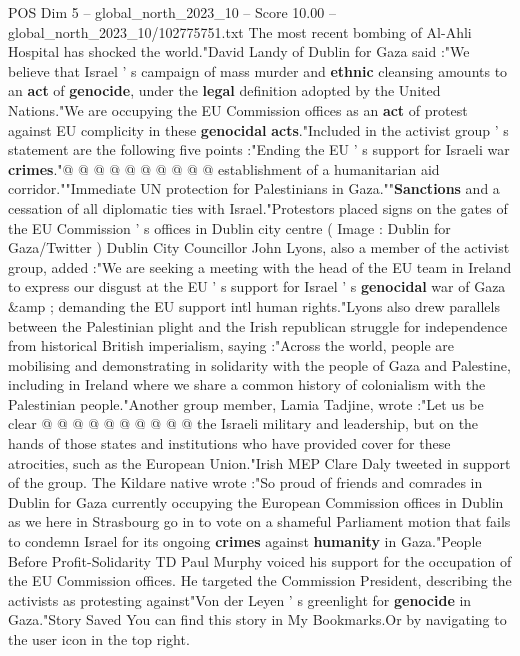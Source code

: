 \begin{textsample}{POS Dim 5 – global\_north\_2023\_10 – Score 10.00 – global\_north\_2023\_10/102775751.txt}
The most recent bombing of Al-Ahli Hospital has shocked the world."David Landy of Dublin for Gaza said :"We believe that Israel ' s campaign of mass murder and \textbf{ethnic} cleansing amounts to an \textbf{act} of \textbf{genocide}, under the \textbf{legal} definition adopted by the United Nations."We are occupying the EU Commission offices as an \textbf{act} of protest against EU complicity in these \textbf{genocidal} \textbf{acts}."Included in the activist group ' s statement are the following five points :"Ending the EU ' s support for Israeli war \textbf{crimes}."@ @ @ @ @ @ @ @ @ @ establishment of a humanitarian aid corridor.""Immediate UN protection for Palestinians in Gaza.""\textbf{Sanctions} and a cessation of all diplomatic ties with Israel."Protestors placed signs on the gates of the EU Commission ' s offices in Dublin city centre ( Image : Dublin for Gaza/Twitter ) Dublin City Councillor John Lyons, also a member of the activist group, added :"We are seeking a meeting with the head of the EU team in Ireland to express our disgust at the EU ' s support for Israel ' s \textbf{genocidal} war of Gaza \&amp ; demanding the EU support intl human rights."Lyons also drew parallels between the Palestinian plight and the Irish republican struggle for independence from historical British imperialism, saying :"Across the world, people are mobilising and demonstrating in solidarity with the people of Gaza and Palestine, including in Ireland where we share a common history of colonialism with the Palestinian people."Another group member, Lamia Tadjine, wrote :"Let us be clear @ @ @ @ @ @ @ @ @ @ the Israeli military and leadership, but on the hands of those states and institutions who have provided cover for these atrocities, such as the European Union."Irish MEP Clare Daly tweeted in support of the group.
The Kildare native wrote :"So proud of friends and comrades in Dublin for Gaza currently occupying the European Commission offices in Dublin as we here in Strasbourg go in to vote on a shameful Parliament motion that fails to condemn Israel for its ongoing \textbf{crimes} against \textbf{humanity} in Gaza."People Before Profit-Solidarity TD Paul Murphy voiced his support for the occupation of the EU Commission offices.
He targeted the Commission President, describing the activists as protesting against"Von der Leyen ' s greenlight for \textbf{genocide} in Gaza."Story Saved You can find this story in My Bookmarks.Or by navigating to the user icon in the top right.

\end{textsample}
